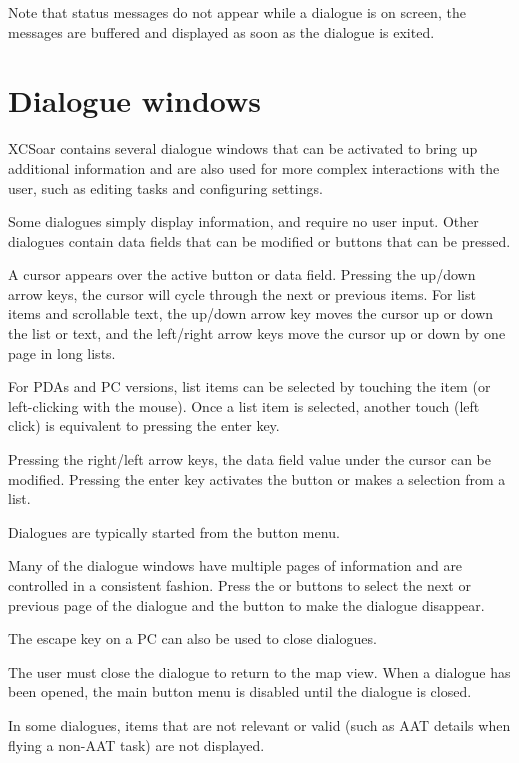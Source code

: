 Note that status messages do not appear while a dialogue is on screen, the
messages are buffered and displayed as soon as the dialogue is exited.


\section{Dialogue windows}\label{sec:dialog-windows}

XCSoar contains several dialogue windows that can be activated to bring up
additional information and are also used for more complex interactions with the
user, such as editing tasks and configuring settings.

Some dialogues simply display information, and require no user input. Other
dialogues contain data fields that can be modified or buttons that can be pressed.  

A cursor appears over the active button or data field. Pressing the up/down
arrow keys, the cursor will cycle
through the next or previous items. For list items and scrollable text, the
up/down arrow key moves the cursor up or down the list or text, and the
left/right arrow keys move the cursor up or down by one page in long lists.

For PDAs and PC versions, list items can be selected by touching the item (or
left-clicking with the mouse). Once a list item is selected, another touch
(left click) is equivalent to pressing the enter key.

Pressing the right/left arrow keys, the data field value under the
cursor can be modified. Pressing the enter key activates the button or
makes a selection from a list.

Dialogues are typically started from the button menu.  

Many of the dialogue windows have multiple pages of information and are controlled
in a consistent fashion. Press the \button{$<$} or \button{$>$} buttons to
select the next or previous page of the dialogue and the  button to
make the dialogue disappear.

The escape key on a PC can also be used to close dialogues.

The user must close the dialogue to return to the map view. When a dialogue
has been opened, the main button menu is disabled until the dialogue is closed.

In some dialogues, items that are not relevant or valid (such as AAT details when
flying a non-AAT task) are not displayed.

